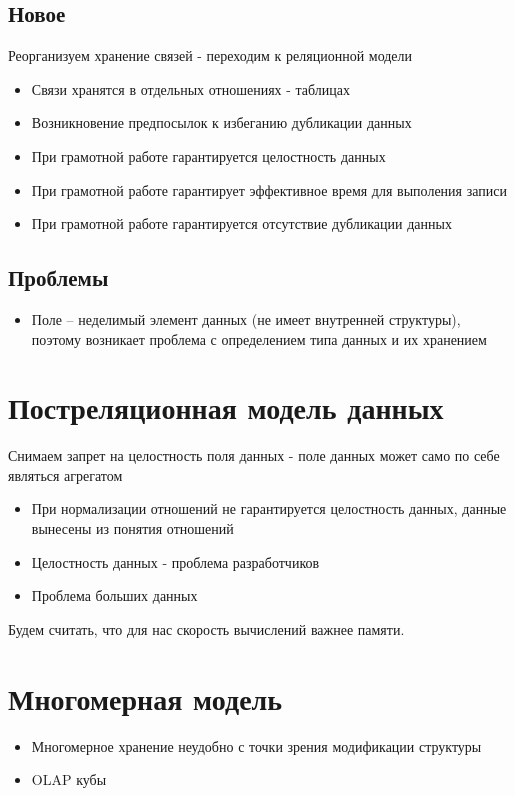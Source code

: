 \subsection{Новое}
Реорганизуем хранение связей - переходим к реляционной модели
\begin{itemize}
    \item Связи хранятся в отдельных отношениях - таблицах
    \item Возникновение предпосылок к избеганию дубликации данных
    \item При грамотной работе гарантируется целостность данных
    \item При грамотной работе гарантирует эффективное время для  выполения записи
    \item При грамотной работе гарантируется отсутствие дубликации данных
\end{itemize}

\subsection{Проблемы}

\begin{itemize}
    \item Поле -- неделимый элемент данных (не имеет внутренней структуры), поэтому возникает проблема с определением типа данных и их хранением
\end{itemize}

\newpage

\section{Постреляционная модель данных}

Снимаем запрет на целостность поля данных - поле данных может само по себе являться агрегатом

\begin{itemize}
    \item При нормализации отношений не гарантируется целостность данных, данные вынесены из понятия отношений
    \item Целостность данных - проблема разработчиков
    \item Проблема больших данных
\end{itemize}

Будем считать, что для нас скорость вычислений важнее памяти.


\section{Многомерная модель}

\begin{itemize}
    \item Многомерное хранение неудобно с точки зрения модификации структуры
    \item OLAP кубы
\end{itemize}


